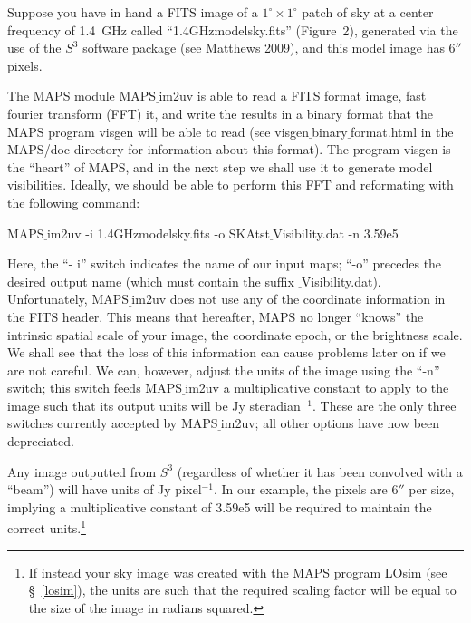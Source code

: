 \documentclass[12pt,psfig]{article}
\begin{document}

Suppose you have  
in hand a FITS image of a $1^{\circ}\times1^{\circ}$ patch of 
sky at a center frequency of 
1.4~GHz called  ``1.4GHzmodelsky.fits'' (Figure~2), generated via the use
of the $S^{3}$ software package (see Matthews 2009), and this model image has
$6''$ pixels.

The  MAPS module {\sf MAPS$\underline~$im2uv} is able to read
a FITS format image, fast fourier transform (FFT) it, and write the
results in a binary format that the MAPS program {\sf visgen} will be
able to read (see visgen$\underline~$binary$\underline~$format.html in
the {\sf MAPS/doc} directory for information about this format). The
program {\sf visgen} is the ``heart'' of MAPS, and in the next step we
shall use it to generate
model visibilities. Ideally, we should be able to perform this FFT and
reformating 
with the following command:

\bigskip

\noindent{\tiny\%} MAPS$\underline~$im2uv -i 1.4GHzmodelsky.fits -o
SKAtst$\underline~$Visibility.dat -n 3.59e5

\bigskip

\noindent Here, the ``- i'' switch indicates the name of our input maps;
``-o'' precedes the desired output name (which must contain the suffix
{\sf $\underline~$Visibility.dat}). Unfortunately, {\sf 
MAPS$\underline~$im2uv} does not use any of the coordinate information
in the FITS header. This means that hereafter, MAPS no longer
``knows'' the intrinsic spatial scale of your image, the coordinate
epoch, or the brightness scale. We shall see that the loss of
this information can cause problems later on if we are not careful.
We can, however, adjust the units of the image using the ``-n''
switch; this switch
feeds MAPS$\underline~$im2uv a multiplicative constant to apply to the image
such that its output units will be Jy steradian$^{-1}$.
These are the only three switches currently accepted by MAPS$\underline~$im2uv;
all other options have now been depreciated.

Any image outputted from $S^{3}$ (regardless of whether it has been
convolved with a ``beam'') will have units of Jy pixel$^{-1}$.
In our example, the pixels are 6$''$ per size, implying a 
multiplicative constant of 3.59e5
will be required to maintain the correct units.\footnote{If instead your sky image was created with
the MAPS program {\sf LOsim} (see \S~\ref{losim}), the units are such that the
required scaling factor will be equal to the size of the image in
radians squared.} 
\end{document}
